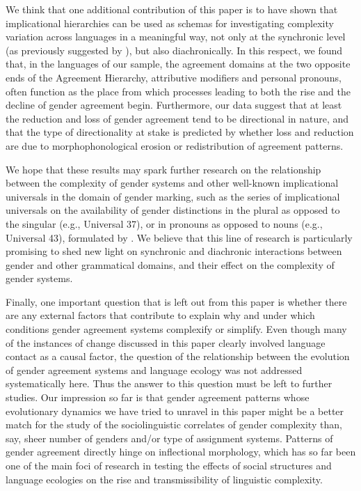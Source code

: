 \documentclass[output=collectionpaper]{langsci/langscibook}
\begin{document}
We think that one additional contribution of this paper is to have shown that implicational hierarchies can be used as schemas for investigating complexity variation across languages in a meaningful way, not only at the synchronic level (as previously suggested by \citealt{Miestamo2009}), but also diachronically. In this respect, we found that, in the languages of our sample, the agreement domains at the two opposite ends of the Agreement Hierarchy, attributive modifiers and personal pronouns, often function as the place from which processes leading to both the rise and the decline of gender agreement begin. Furthermore, our data suggest that at least the reduction and loss of gender agreement tend to be directional in nature, and that the type of directionality at stake is predicted by whether loss and reduction are due to morphophonological erosion or redistribution of agreement patterns.

We hope that these results may spark further research on the relationship between the complexity of gender systems and other well-known implicational universals in the domain of gender marking, such as the series of implicational universals on the availability of gender distinctions in the plural as opposed to the singular (e.g., Universal 37), or in pronouns as opposed to nouns (e.g., Universal 43), formulated by \citet{Greenberg1963}. We believe that this line of research is particularly promising to shed new light on synchronic and diachronic interactions between gender and other grammatical domains, and their effect on the complexity of gender systems.





Finally, one important question that is left out from this paper is whether there are any external factors that contribute to explain why and under which conditions gender agreement systems complexify or simplify. Even though many of the instances of change discussed in this paper clearly involved language contact as a causal factor, the question of the relationship between the evolution of gender agreement systems and language ecology  was not addressed systematically here. Thus the answer to this question must be left to further studies. Our impression so far is that gender agreement patterns \textendash{} whose evolutionary dynamics we have tried to unravel in this paper \textendash{} might be a better match for the study of the sociolinguistic correlates of gender complexity than, say, sheer number of genders and/or type of assignment systems. Patterns of gender agreement directly hinge on inflectional morphology, which has so far been one of the main foci of research in testing the effects of social structures and language ecologies on the rise and transmissibility of linguistic complexity.
\end{document}
